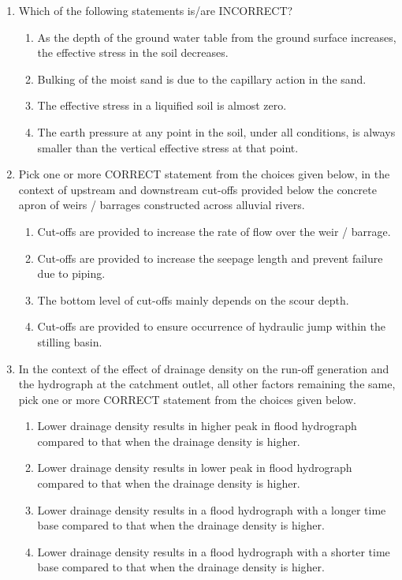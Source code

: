 \documentclass[journal,12pt,onecolumn]{article}
\theoremstyle{remark}
\begin{document}
\begin{enumerate}
    \item Which of the following statements is/are INCORRECT?

    \hfill{}
    \begin{enumerate}
        \item As the depth of the ground water table from the ground surface increases, the effective stress in the soil decreases.
        \item Bulking of the moist sand is due to the capillary action in the sand.
        \item The effective stress in a liquified soil is almost zero.
        \item The earth pressure at any point in the soil, under all conditions, is always smaller than the vertical effective stress at that point.
    \end{enumerate}

    \item Pick one or more CORRECT statement from the choices given below, in the context of upstream and downstream cut-offs provided below the concrete apron of weirs / barrages constructed across alluvial rivers.

    \hfill{}
    \begin{enumerate}
        \item Cut-offs are provided to increase the rate of flow over the weir / barrage.
        \item Cut-offs are provided to increase the seepage length and prevent failure due to piping.
        \item The bottom level of cut-offs mainly depends on the scour depth.
        \item Cut-offs are provided to ensure occurrence of hydraulic jump within the stilling basin.
    \end{enumerate}

    \item In the context of the effect of drainage density on the run-off generation and the hydrograph at the catchment outlet, all other factors remaining the same, pick one or more CORRECT statement from the choices given below.

    \hfill{}
    \begin{enumerate}
        \item Lower drainage density results in higher peak in flood hydrograph compared to that when the drainage density is higher.
        \item Lower drainage density results in lower peak in flood hydrograph compared to that when the drainage density is higher.
        \item Lower drainage density results in a flood hydrograph with a longer time base compared to that when the drainage density is higher.
        \item Lower drainage density results in a flood hydrograph with a shorter time base compared to that when the drainage density is higher.
    \end{enumerate}


\end{enumerate}
\end{document}

